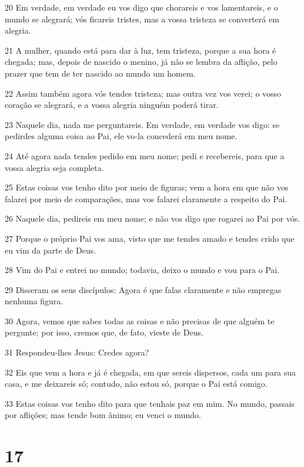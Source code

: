\par 20 Em verdade, em verdade eu vos digo que chorareis e vos lamentareis, e o mundo se alegrará; vós ficareis tristes, mas a vossa tristeza se converterá em alegria.
\par 21 A mulher, quando está para dar à luz, tem tristeza, porque a sua hora é chegada; mas, depois de nascido o menino, já não se lembra da aflição, pelo prazer que tem de ter nascido ao mundo um homem.
\par 22 Assim também agora vós tendes tristeza; mas outra vez vos verei; o vosso coração se alegrará, e a vossa alegria ninguém poderá tirar.
\par 23 Naquele dia, nada me perguntareis. Em verdade, em verdade vos digo: se pedirdes alguma coisa ao Pai, ele vo-la concederá em meu nome.
\par 24 Até agora nada tendes pedido em meu nome; pedi e recebereis, para que a vossa alegria seja completa.
\par 25 Estas coisas vos tenho dito por meio de figuras; vem a hora em que não vos falarei por meio de comparações, mas vos falarei claramente a respeito do Pai.
\par 26 Naquele dia, pedireis em meu nome; e não vos digo que rogarei ao Pai por vós.
\par 27 Porque o próprio Pai vos ama, visto que me tendes amado e tendes crido que eu vim da parte de Deus.
\par 28 Vim do Pai e entrei no mundo; todavia, deixo o mundo e vou para o Pai.
\par 29 Disseram os seus discípulos: Agora é que falas claramente e não empregas nenhuma figura.
\par 30 Agora, vemos que sabes todas as coisas e não precisas de que alguém te pergunte; por isso, cremos que, de fato, vieste de Deus.
\par 31 Respondeu-lhes Jesus: Credes agora?
\par 32 Eis que vem a hora e já é chegada, em que sereis dispersos, cada um para sua casa, e me deixareis só; contudo, não estou só, porque o Pai está comigo.
\par 33 Estas coisas vos tenho dito para que tenhais paz em mim. No mundo, passais por aflições; mas tende bom ânimo; eu venci o mundo.

\chapter{17}


